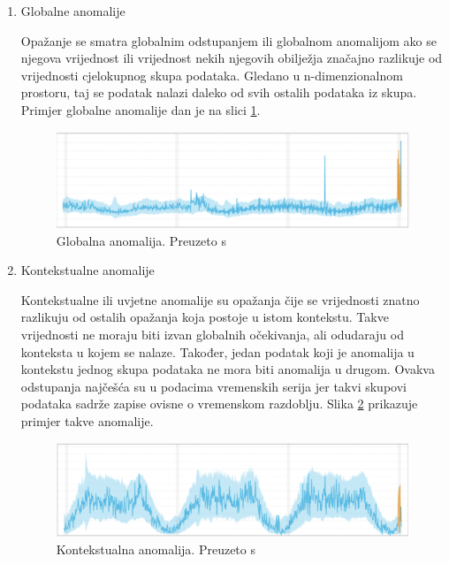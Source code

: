 \documentclass[utf8, diplomski, numeric]{fer}
\begin{document}
\begin{enumerate}
\item Globalne anomalije

Opažanje se smatra globalnim odstupanjem ili globalnom anomalijom ako se njegova vrijednost ili vrijednost nekih njegovih obilježja značajno razlikuje od vrijednosti cjelokupnog skupa podataka. Gledano u n-dimenzionalnom prostoru, taj se podatak nalazi daleko od svih ostalih podataka iz skupa. Primjer globalne anomalije dan je na slici \ref{fig:outlier1}.

\begin{figure}[htb]
\includegraphics[width=1\textwidth]{images/outlier_type1.png}
\centering
\caption{Globalna anomalija. Preuzeto s  \cite{OutlierAnalysis}}
\label{fig:outlier1}
\end{figure}

\item Kontekstualne anomalije

Kontekstualne ili uvjetne anomalije su opažanja čije se vrijednosti znatno razlikuju od ostalih opažanja koja postoje u istom kontekstu. Takve vrijednosti ne moraju biti izvan globalnih očekivanja, ali odudaraju od konteksta u kojem se nalaze. Također, jedan podatak koji je anomalija u kontekstu jednog skupa podataka ne mora biti anomalija u drugom. Ovakva odstupanja najčešća su u podacima vremenskih serija jer takvi skupovi podataka sadrže zapise ovisne o vremenskom razdoblju. Slika \ref{fig:outlier2} prikazuje primjer takve anomalije.

\begin{figure}[htb]
\includegraphics[width=1\textwidth]{images/outlier_type2.png}
\centering
\caption{Kontekstualna anomalija. Preuzeto s  \cite{OutlierAnalysis}}
\label{fig:outlier2}
\end{figure}


\end{enumerate}
\end{document}
